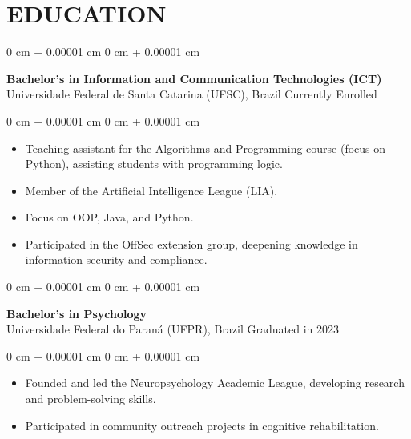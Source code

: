 \documentclass[10pt, letterpaper]{article}
\newenvironment{highlights}{
    \begin{itemize}[
        topsep=0.10 cm,
        parsep=0.10 cm,
        partopsep=0pt,
        itemsep=0pt,
        leftmargin=0 cm + 10pt
    ]
}{
    \end{itemize}
}
\newenvironment{onecolentry}{
    \begin{adjustwidth}{
        0 cm + 0.00001 cm
    }{
        0 cm + 0.00001 cm
    }
}{
    \end{adjustwidth}
}
\begin{document}
\section{EDUCATION}

\begin{onecolentry}
    \setcolumnwidth{\fill, 4.5cm}
    \begin{paracol}{2}
        \textbf{Bachelor’s in Information and Communication Technologies (ICT)} \\ Universidade Federal de Santa Catarina (UFSC), Brazil
        \switchcolumn
        \raggedleft Currently Enrolled
    \end{paracol}
\end{onecolentry}
\vspace{0.10cm}
\begin{onecolentry}
    \begin{highlights}
                \item Teaching assistant for the Algorithms and Programming course (focus on Python), assisting students with programming logic.
                \item Member of the Artificial Intelligence League (LIA).
                \item Focus on OOP, Java, and Python.
                \item Participated in the OffSec extension group, deepening knowledge in information security and compliance.
    \end{highlights}
\end{onecolentry}

\vspace{0.2cm}

\begin{onecolentry}
    \setcolumnwidth{\fill, 4.5cm}
    \begin{paracol}{2}
        \textbf{Bachelor’s in Psychology} \\ Universidade Federal do Paraná (UFPR), Brazil
        \switchcolumn
        \raggedleft Graduated in 2023
    \end{paracol}
\end{onecolentry}
\vspace{0.10cm}
\begin{onecolentry}
    \begin{highlights}
                \item Founded and led the Neuropsychology Academic League, developing research and problem-solving skills.
                \item Participated in community outreach projects in cognitive rehabilitation.
    \end{highlights}
\end{onecolentry}
\end{document}
